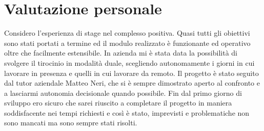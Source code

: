 \section{Valutazione personale}

Considero l’esperienza di stage nel complesso positiva. Quasi tutti gli obiettivi sono stati portati a termine ed il modulo realizzato è funzionante ed operativo oltre che facilmente estensibile. In azienda mi è stata data la possibilità di svolgere il tirocinio in modalità duale, scegliendo autonomamente i giorni in cui lavorare in presenza e quelli in cui lavorare da remoto. Il progetto è stato seguito dal tutor aziendale Matteo Neri, che si è sempre dimostrato aperto al confronto e a lasciarmi autonomia decisionale quando possibile. \newline{}
Fin dal primo giorno di sviluppo ero sicuro che sarei riuscito a completare il progetto in maniera soddisfacente nei tempi richiesti e così è stato, imprevisti e problematiche non sono mancati ma sono sempre stati risolti.
